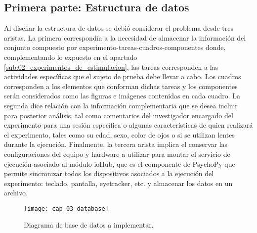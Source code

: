 \documentclass[\main/main.tex]{subfiles}
\begin{document}
	\subsection{Primera parte: Estructura de datos}
	\label{sub:03_estructura_datos}
		Al diseñar la estructura de datos se debió considerar el problema desde tres aristas. La primera correspondía a la necesidad de almacenar la información del conjunto compuesto por experimento-tareas-cuadros-componentes donde, complementando lo expuesto en el apartado \ref{sub:02_experimentos_de_estimulacion}, las tareas corresponden a las actividades específicas que el sujeto de prueba debe llevar a cabo. Los cuadros corresponden a los elementos que conforman dichas tareas y los componentes serán considerados como las figuras e imágenes contenidas en cada cuadro. La segunda dice relación con la información complementaria que se desea incluir para posterior análisis, tal como comentarios del investigador encargado del experimento para una sesión específica o algunas características de quien realizará el experimento, tales como su edad, sexo, color de ojos o si se utilizan lentes durante la ejecución. Finalmente, la tercera arista implica el conservar las configuraciones del equipo y hardware a utilizar para montar el servicio de ejecución asociado al módulo ioHub, que es el componente de PsychoPy que permite sincronizar todos los dispositivos asociados a la ejecución del experimento: teclado, pantalla, eyetracker, etc. y almacenar los datos en un archivo. 
		\begin{figure}[H]
			\centering
			\texttt{[image: cap\_03\_database]}
			\caption{Diagrama de base de datos a implementar.}
			\label{fig:03_database}
		\end{figure} 
\end{document}

